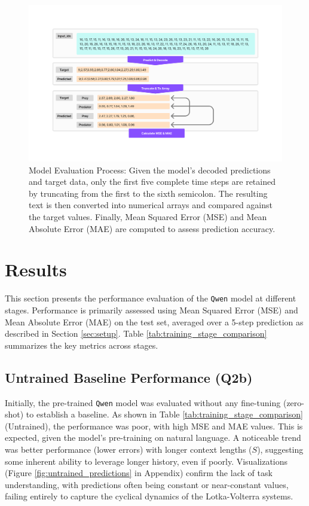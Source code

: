 \documentclass{article}
\begin{document}
\begin{figure}[!htbp]
    \centering
    \includegraphics[width=0.8\linewidth]{M2 Course Work//Images/Metric_calculation.png}
    \caption{Model Evaluation Process: Given the model's decoded predictions and target data, only the first five complete time steps are retained by truncating from the first to the sixth semicolon. The resulting text is then converted into numerical arrays and compared against the target values. Finally, Mean Squared Error (MSE) and Mean Absolute Error (MAE) are computed to assess prediction accuracy.}
    \label{fig:metric-calculation}
\end{figure}


\section{Results}
\label{sec:results}

This section presents the performance evaluation of the \texttt{Qwen} model at different stages. Performance is primarily assessed using Mean Squared Error (MSE) and Mean Absolute Error (MAE) on the test set, averaged over a 5-step prediction as described in Section \ref{sec:setup}. Table \ref{tab:training_stage_comparison} summarizes the key metrics across stages.

\subsection{Untrained Baseline Performance (Q2b)}
\label{sec:untrained}
Initially, the pre-trained \texttt{Qwen} model was evaluated without any fine-tuning (zero-shot) to establish a baseline. As shown in Table \ref{tab:training_stage_comparison} (Untrained), the performance was poor, with high MSE and MAE values. This is expected, given the model's pre-training on natural language. A noticeable trend was better performance (lower errors) with longer context lengths ($S$), suggesting some inherent ability to leverage longer history, even if poorly. Visualizations (Figure \ref{fig:untrained_predictions} in Appendix) confirm the lack of task understanding, with predictions often being constant or near-constant values, failing entirely to capture the cyclical dynamics of the Lotka-Volterra systems.
\end{document}
